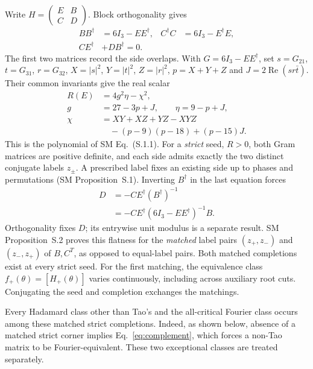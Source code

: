 Write $H=\left(\begin{smallmatrix}E&B\\C&D\end{smallmatrix}\right)$. Block orthogonality gives
\[
 \begin{aligned}
 BB^\dagger&=6I_3-EE^\dagger,& C^\dagger C&=6I_3-E^\dagger E,\\
 CE^\dagger&+DB^\dagger=0.&&
 \end{aligned}
\]
The first two matrices record the side overlaps. With $G=6I_3-EE^\dagger$, set $s=G_{21}$, $t=G_{31}$, $r=G_{32}$, $X=|s|^2$, $Y=|t|^2$, $Z=|r|^2$, $p=X+Y+Z$ and $J=2\operatorname{Re}(sr\bar t)$. Their common invariants give the real scalar
\begin{equation}
 \begin{aligned}
 R(E)&=4g^2\eta-\chi^2,\\
 g&=27-3p+J,\qquad \eta=9-p+J,\\
 \chi&=XY+XZ+YZ-XYZ\\
 &\quad-(p-9)(p-18)+(p-15)J.
 \end{aligned}
 \label{eq:scalar}
\end{equation}
This is the polynomial of SM Eq.~(S.1.1). For a \emph{strict} seed, $R>0$, both Gram matrices are positive definite, and each side admits exactly the two distinct conjugate labels $z_\pm$. A prescribed label fixes an existing side up to phases and permutations (SM Proposition~S.1). Inverting $B^\dagger$ in the last equation forces
\begin{equation}
 \begin{aligned}
 D&=-CE^\dagger(B^\dagger)^{-1}\\
  &=-CE^\dagger(6I_3-EE^\dagger)^{-1}B.
 \end{aligned}
 \label{eq:forced}
\end{equation}
Orthogonality fixes $D$; its entrywise unit modulus is a separate result. SM Proposition~S.2 proves this flatness for the \emph{matched} label pairs $(z_+,z_-)$ and $(z_-,z_+)$ of $B,C^T$, as opposed to equal-label pairs. Both matched completions exist at every strict seed. For the first matching, the equivalence class $f_+(\theta)=[H_+(\theta)]$ varies continuously, including across auxiliary root cuts. Conjugating the seed and completion exchanges the matchings.

Every Hadamard class other than Tao's and the all-critical Fourier class occurs among these matched strict completions. Indeed, as shown below, absence of a matched strict corner implies Eq.~\eqref{eq:complement}, which forces a non-Tao matrix to be Fourier-equivalent. These two exceptional classes are treated separately.

